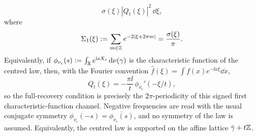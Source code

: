 \begin{theorem}
\begin{equation}
\sigma(\xi)|Q_t(\xi)|^2\,\dd\xi,
\end{equation}
where
\[
\Sigma_1(\xi):=\sum_{m\in\mathbb{Z}}e^{-2|\xi+2\pi m|}
=\frac{\sigma(\xi)}{\pi}.
\]
Equivalently, if $\phi_{\nu_c}(s):=\int_{\mathbb{R}}e^{\mathrm{i} sX_c}\,\mathrm{d}\nu(\gamma)$
is the characteristic function of the centred law, then, with the Fourier
convention $\widehat f(\xi)=\int f(x)e^{-\ii x\xi}\dd x$,
\[
Q_t(\xi)=-\frac{\pi\ii}{t}\,\phi_{\nu_c}'(-\xi/t),
\]
so the full-recovery condition is precisely the $2\pi$-periodicity of this
signed first characteristic-function channel.  Negative frequencies are read
with the usual conjugate symmetry
$\phi_{\nu_c}(-s)=\overline{\phi_{\nu_c}(s)}$, and no symmetry of the law is
assumed.  Equivalently, the centred law is supported on the affine lattice
$\bar{\gamma}+t\mathbb{Z}$.
\end{theorem}

